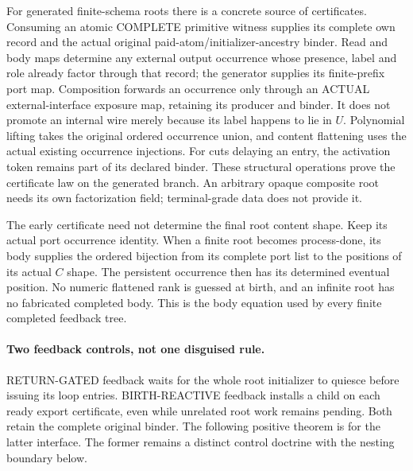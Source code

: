 \documentclass[11pt]{article}
\begin{document}
For generated finite-schema roots there is a concrete source of certificates. Consuming an atomic COMPLETE primitive witness supplies its complete own record and the actual original paid-atom/initializer-ancestry binder. Read and body maps determine any external output occurrence whose presence, label and role already factor through that record; the generator supplies its finite-prefix port map. Composition forwards an occurrence only through an ACTUAL external-interface exposure map, retaining its producer and binder. It does not promote an internal wire merely because its label happens to lie in $U$. Polynomial lifting takes the original ordered occurrence union, and content flattening uses the actual existing occurrence injections. For cuts delaying an entry, the activation token remains part of its declared binder. These structural operations prove the certificate law on the generated branch. An arbitrary opaque composite root needs its own factorization field; terminal-grade data does not provide it.

The early certificate need not determine the final root content shape. Keep its actual port occurrence identity. When a finite root becomes process-done, its body supplies the ordered bijection from its complete port list to the positions of its actual $C$ shape. The persistent occurrence then has its determined eventual position. No numeric flattened rank is guessed at birth, and an infinite root has no fabricated completed body. This is the body equation used by every finite completed feedback tree.

\paragraph{Two feedback controls, not one disguised rule.}
RETURN-GATED feedback waits for the whole root initializer to quiesce before issuing its loop entries. BIRTH-REACTIVE feedback installs a child on each ready export certificate, even while unrelated root work remains pending. Both retain the complete original binder. The following positive theorem is for the latter interface. The former remains a distinct control doctrine with the nesting boundary below.
\end{document}
